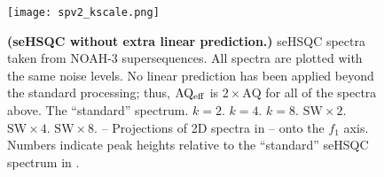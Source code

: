 \begin{figure}
    \centering
    \texttt{[image: spv2\_kscale.png]}
    {\label{fig:spv2_kscale_std}}
    {\label{fig:spv2_kscale_k2}}
    {\label{fig:spv2_kscale_k4}}
    {\label{fig:spv2_kscale_k8}}
    {\label{fig:spv2_kscale_sw2}}
    {\label{fig:spv2_kscale_sw4}}
    {\label{fig:spv2_kscale_sw8}}
    {\label{fig:spv2_kscale_std_proj}}
    {\label{fig:spv2_kscale_k2_proj}}
    {\label{fig:spv2_kscale_k4_proj}}
    {\label{fig:spv2_kscale_k8_proj}}
    {\label{fig:spv2_kscale_sw2_proj}}
    {\label{fig:spv2_kscale_sw4_proj}}
    {\label{fig:spv2_kscale_sw8_proj}}
    \caption{
        \textbf{(seHSQC without extra linear prediction.)}
        \nitrogen{} seHSQC spectra taken from NOAH-3  supersequences.
        All spectra are plotted with the same noise levels.
        No linear prediction has been applied beyond the standard processing; thus, $\mathrm{AQ_{eff}}$ is $2 \times \mathrm{AQ}$ for all of the spectra above.
        \textbf{} The ``standard'' spectrum.
        \textbf{} $k = 2$.
        \textbf{} $k = 4$.
        \textbf{} $k = 8$.
        \textbf{} $\mathrm{SW} \times 2$.
        \textbf{} $\mathrm{SW} \times 4$.
        \textbf{} $\mathrm{SW} \times 8$.
        \textbf{}--\textbf{} Projections of 2D spectra in -- onto the $f_1$ axis.
        Numbers indicate peak heights relative to the ``standard'' seHSQC spectrum in .
        \grami{}
    }
    \label{fig:spv2_kscale}
\end{figure}

